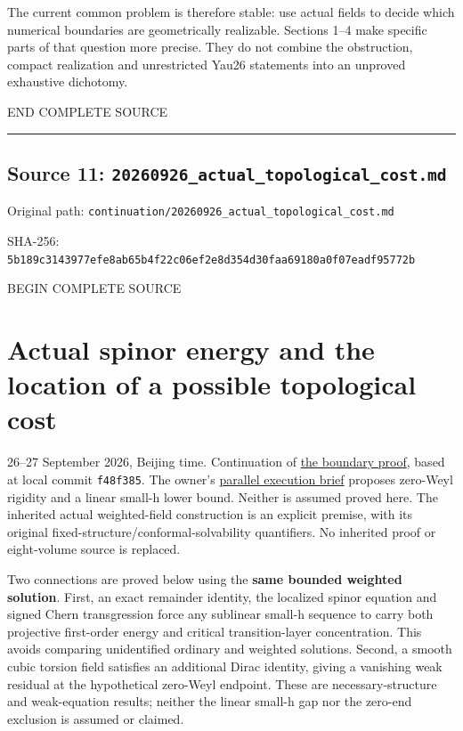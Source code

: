 \documentclass[
  10pt,
]{article}
\begin{document}
The current common problem is therefore stable: use actual fields to
decide which numerical boundaries are geometrically realizable. Sections
1--4 make specific parts of that question more precise. They do not
combine the obstruction, compact realization and unrestricted Yau26
statements into an unproved exhaustive dichotomy.

END COMPLETE SOURCE

\begin{center}\rule{0.5\linewidth}{0.5pt}\end{center}

\hypertarget{source-11-20260926_actual_topological_cost.md}{%
\subsection{Source 11:
\nolinkurl{20260926_actual_topological_cost.md}}\label{source-11-20260926_actual_topological_cost.md}}

Original path:
\nolinkurl{continuation/20260926_actual_topological_cost.md}

SHA-256:
\nolinkurl{5b189c3143977efe8ab65b4f22c06ef2e8d354d30faa69180a0f07eadf95772b}

BEGIN COMPLETE SOURCE

\hypertarget{actual-spinor-energy-and-the-location-of-a-possible-topological-cost}{%
\section{Actual spinor energy and the location of a possible topological
cost}\label{actual-spinor-energy-and-the-location-of-a-possible-topological-cost}}

26--27 September 2026, Beijing time. Continuation of
\href{20260926_boundary_compatibility.md}{the boundary proof}, based at
local commit \texttt{f48f385}. The owner's
\href{../guidance/source/20260926_web_parallel_execution.zh.md}{parallel
execution brief} proposes zero-Weyl rigidity and a linear small-h lower
bound. Neither is assumed proved here. The inherited actual
weighted-field construction is an explicit premise, with its original
fixed-structure/conformal-solvability quantifiers. No inherited proof or
eight-volume source is replaced.

Two connections are proved below using the \textbf{same bounded weighted
solution}. First, an exact remainder identity, the localized spinor
equation and signed Chern transgression force any sublinear small-h
sequence to carry both projective first-order energy and critical
transition-layer concentration. This avoids comparing unidentified
ordinary and weighted solutions. Second, a smooth cubic torsion field
satisfies an additional Dirac identity, giving a vanishing weak residual
at the hypothetical zero-Weyl endpoint. These are necessary-structure
and weak-equation results; neither the linear small-h gap nor the
zero-end exclusion is assumed or claimed.
\end{document}
